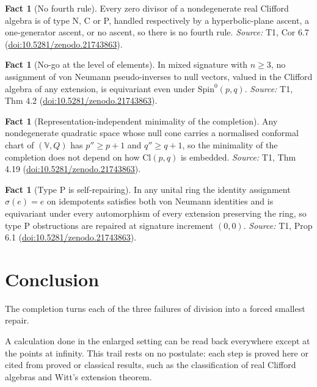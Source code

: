 \documentclass[11pt]{article}
\theoremstyle{definition}
\newtheorem{fact}[theorem]{Fact}
\theoremstyle{plain}
\providecommand{\Cl}{}\renewcommand{\Cl}{\mathrm{Cl}}
\providecommand{\Spin}{}\renewcommand{\Spin}{\mathrm{Spin}}
\begin{document}
\begin{fact}[No fourth rule]\label{c:transport.no-fourth-rule}
Every zero divisor of a nondegenerate real Clifford algebra is of type N, C or P, handled respectively by a hyperbolic-plane ascent, a one-generator ascent, or no ascent, so there is no fourth rule.
\emph{Source:} T1, Cor 6.7 (\href{https://doi.org/10.5281/zenodo.21743863}{doi:10.5281/zenodo.21743863}).
\end{fact}

\begin{fact}[No-go at the level of elements]\label{c:transport.no-go-level-elements}
In mixed signature with $n \geq 3$, no assignment of von Neumann pseudo-inverses to null vectors, valued in the Clifford algebra of any extension, is equivariant even under $\Spin^0(p,q)$.
\emph{Source:} T1, Thm 4.2 (\href{https://doi.org/10.5281/zenodo.21743863}{doi:10.5281/zenodo.21743863}).
\end{fact}

\begin{fact}[Representation-independent minimality of the completion]\label{c:transport.representation-independent-minimality-completion}
Any nondegenerate quadratic space whose null cone carries a normalised conformal chart of $(\mathbb{V}, Q)$ has $p'' \geq p + 1$ and $q'' \geq q + 1$, so the minimality of the completion does not depend on how $\Cl(p,q)$ is embedded.
\emph{Source:} T1, Thm 4.19 (\href{https://doi.org/10.5281/zenodo.21743863}{doi:10.5281/zenodo.21743863}).
\end{fact}

\begin{fact}[Type P is self-repairing]\label{c:transport.type-p-self-repairing}
In any unital ring the identity assignment $\sigma(e) = e$ on idempotents satisfies both von Neumann identities and is equivariant under every automorphism of every extension preserving the ring, so type P obstructions are repaired at signature increment $(0,0)$.
\emph{Source:} T1, Prop 6.1 (\href{https://doi.org/10.5281/zenodo.21743863}{doi:10.5281/zenodo.21743863}).
\end{fact}

\section*{Conclusion}
The completion turns each of the three failures of division into a forced smallest repair.

A calculation done in the enlarged setting can be read back everywhere except at the points at infinity. This trail rests on no postulate: each step is proved here or cited from proved or classical results, such as the classification of real Clifford algebras and Witt's extension theorem.
\end{document}
